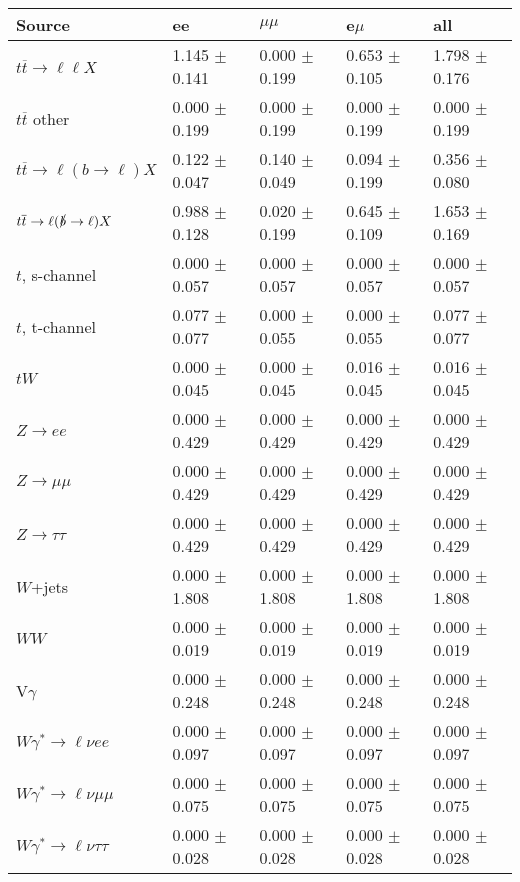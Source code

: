 \begin{tabular}{l | l l l l}
\hline\hline
 Source  &  ee  &  $\mu\mu$  &  e$\mu$  &  all \\
\hline
$t\overline{t}\rightarrow \ell\ell X$ &  1.145 $\pm$  0.141 &  0.000 $\pm$  0.199 &  0.653 $\pm$  0.105 &  1.798 $\pm$  0.176\\
$t\overline{t}$ other &  0.000 $\pm$  0.199 &  0.000 $\pm$  0.199 &  0.000 $\pm$  0.199 &  0.000 $\pm$  0.199\\
$t\overline{t}\rightarrow \ell(b\rightarrow \ell)X$ &  0.122 $\pm$  0.047 &  0.140 $\pm$  0.049 &  0.094 $\pm$  0.199 &  0.356 $\pm$  0.080\\
$t\overline{t}\rightarrow \ell(\slashed{b}\rightarrow \ell)X$ &  0.988 $\pm$  0.128 &  0.020 $\pm$  0.199 &  0.645 $\pm$  0.109 &  1.653 $\pm$  0.169\\
\hline
$t$, s-channel &  0.000 $\pm$  0.057 &  0.000 $\pm$  0.057 &  0.000 $\pm$  0.057 &  0.000 $\pm$  0.057\\
$t$, t-channel &  0.077 $\pm$  0.077 &  0.000 $\pm$  0.055 &  0.000 $\pm$  0.055 &  0.077 $\pm$  0.077\\
$tW$ &  0.000 $\pm$  0.045 &  0.000 $\pm$  0.045 &  0.016 $\pm$  0.045 &  0.016 $\pm$  0.045\\
\hline
$Z\rightarrow ee$ &  0.000 $\pm$  0.429 &  0.000 $\pm$  0.429 &  0.000 $\pm$  0.429 &  0.000 $\pm$  0.429\\
$Z\rightarrow\mu\mu$ &  0.000 $\pm$  0.429 &  0.000 $\pm$  0.429 &  0.000 $\pm$  0.429 &  0.000 $\pm$  0.429\\
$Z\rightarrow\tau\tau$ &  0.000 $\pm$  0.429 &  0.000 $\pm$  0.429 &  0.000 $\pm$  0.429 &  0.000 $\pm$  0.429\\
$W$+jets &  0.000 $\pm$  1.808 &  0.000 $\pm$  1.808 &  0.000 $\pm$  1.808 &  0.000 $\pm$  1.808\\
$WW$ &  0.000 $\pm$  0.019 &  0.000 $\pm$  0.019 &  0.000 $\pm$  0.019 &  0.000 $\pm$  0.019\\
\hline
V$\gamma$ &  0.000 $\pm$  0.248 &  0.000 $\pm$  0.248 &  0.000 $\pm$  0.248 &  0.000 $\pm$  0.248\\
$W\gamma^{*}\rightarrow\ell\nu e e$ &  0.000 $\pm$  0.097 &  0.000 $\pm$  0.097 &  0.000 $\pm$  0.097 &  0.000 $\pm$  0.097\\
$W\gamma^{*}\rightarrow\ell\nu\mu\mu$ &  0.000 $\pm$  0.075 &  0.000 $\pm$  0.075 &  0.000 $\pm$  0.075 &  0.000 $\pm$  0.075\\
$W\gamma^{*}\rightarrow\ell\nu\tau\tau$ &  0.000 $\pm$  0.028 &  0.000 $\pm$  0.028 &  0.000 $\pm$  0.028 &  0.000 $\pm$  0.028\\

\end{tabular}
